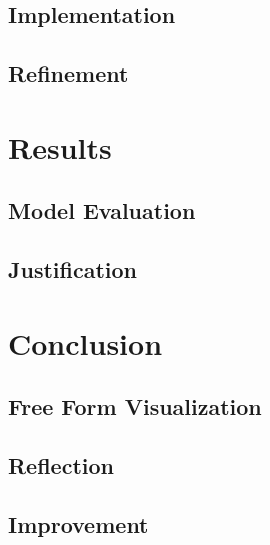 \documentclass[12pt]{article}
\begin{document}
\subsection{Implementation}
\subsection{Refinement}

 
\section{Results}
\subsection{Model Evaluation}
\subsection{Justification}


 
\section{Conclusion}
\subsection{Free Form Visualization}
\subsection{Reflection}
\subsection{Improvement}
\end{document}
